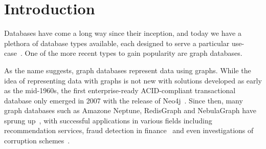 \documentclass[14pt]{constructor-thesis}
\theoremstyle{definition}
\begin{document}
\maketitle
\tableofcontents
\section*{Introduction}

Databases have come a long way since their inception, and today we have a plethora of database types available, each designed to serve a particular use-case~\cite{database-types}. One of the more recent types to gain popularity are graph databases.

As the name suggests, graph databases represent data using graphs. While the idea of representing data with graphs is not new with solutions developed as early as the mid-1960s, the first enterprise-ready ACID-compliant transactional database only emerged in 2007 with the release of Neo4j~\cite{enwiki:1146498781}. Since then, many graph databases such as Amazone Neptune, RedisGraph and NebulaGraph have sprung up~\cite{enwiki:1146498781}, with successful applications in various fields including recommendation services, fraud detection in finance~\cite{neo4j:use-cases} and even investigations of corruption schemes~\cite{icij:offshoreleaks}.

\end{document}
